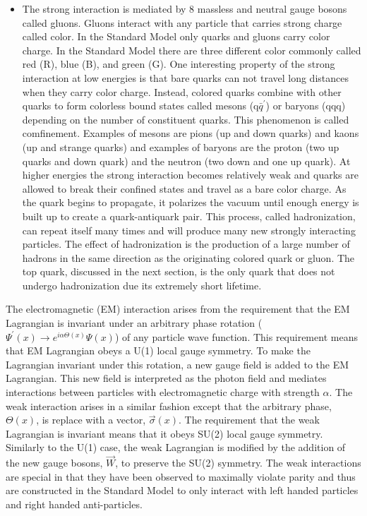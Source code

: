 \begin{itemize}
\item The strong interaction is mediated by 8 massless and neutral gauge bosons called gluons. Gluons interact with any particle that carries strong charge called color. In the Standard Model only quarks and gluons carry color charge. In the Standard Model there are three different color commonly called red (R), blue (B), and green (G). One interesting property of the strong interaction at low energies is that bare quarks can not travel long distances when they carry color charge. Instead, colored quarks combine with other quarks to form colorless bound states called mesons (q$\bar{q}^{'}$) or baryons (qqq) depending on the number of constituent quarks. This phenomenon is called comfinement. Examples of mesons are pions (up and down quarks) and kaons (up and strange quarks) and examples of baryons are the proton (two up quarks and down quark) and the neutron (two down and one up quark). At higher energies the strong interaction becomes relatively weak and quarks are allowed to break their confined states and travel as a bare color charge. As the quark begins to propagate, it polarizes the vacuum until enough energy is built up to create a quark-antiquark pair. This process, called hadronization, can repeat itself many times and will produce many new strongly interacting particles. The effect of hadronization is the production of a large number of hadrons in the same direction as the originating colored quark or gluon. The top quark, discussed in the next section, is the only quark that does not undergo hadronization due its extremely short lifetime.
\end{itemize}




The electromagnetic (EM) interaction arises from the requirement that the EM Lagrangian is invariant under an arbitrary phase rotation (\mbox{$\Psi^{'}(x) \rightarrow e^{i\alpha\Theta(x)}\Psi(x)$}) of any particle wave function. This requirement means that EM Lagrangian obeys a U(1) local gauge symmetry. To make the Lagrangian invariant under this rotation, a new gauge field is added to the EM Lagrangian. This new field is interpreted as the photon field and mediates interactions between particles with electromagnetic charge with strength $\alpha$. The weak interaction arises in a similar fashion except that the arbitrary phase, $\Theta(x)$, is replace with a vector, $\vec{\sigma}(x)$. The requirement that the weak Lagrangian is invariant means that it obeys SU(2) local gauge symmetry. Similarly to the U(1) case, the weak Lagrangian is modified by the addition of the new gauge bosons, $\vec{W}$, to preserve the SU(2) symmetry. The weak interactions are special in that they have been observed to maximally violate parity and thus are constructed in the Standard Model to only interact with left handed particles and right handed anti-particles.

